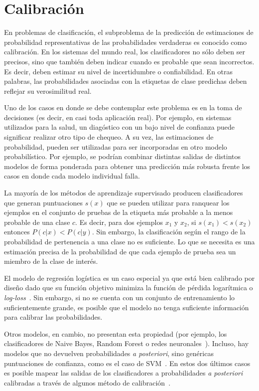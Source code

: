 \chapter{Calibración}\label{appendix:calibracion} 

En problemas de clasificación, el subproblema de la predicción de estimaciones
de probabilidad representativas de las probabilidades verdaderas es conocido
como calibración. En los sistemas del mundo real, los clasificadores no sólo
deben ser precisos, sino que también deben indicar cuando es probable que sean
incorrectos. Es decir, deben estimar su nivel de incertidumbre o confiabilidad.
En otras palabras, las probabilidades asociadas con la etiquetas de clase
predichas deben reflejar su verosimilitud real.

Uno de los casos en donde se debe contemplar este problema es en la toma de
decisiones (es decir, en casi toda aplicación real). Por ejemplo, en sistemas
utilizados para la salud, un diagóstico con un bajo nivel de confianza puede
significar realizar otro tipo de chequeo. A su vez, las estimaciones de
probabilidad, pueden ser utilizadas para ser incorporadas en otro modelo
probabilístico. Por ejemplo, se podrían combinar distintas salidas de distintos
modelos de forma ponderada para obtener una predicción más robusta frente los
casos en donde cada modelo individual falla.

La mayoría de los métodos de aprendizaje supervisado producen clasificadores que
generan puntuaciones $s(x)$ que se pueden utilizar para ranquear los ejemplos en
el conjunto de pruebas de la etiqueta más probable a la menos probable de una
clase $c$. Es decir, para dos ejemplos $x_1$ y $x_2$, si $s(x_1) < s(x_2)$
entonces $P(c|x) < P(c|y)$. Sin embargo, la clasificación según el rango de la
probabilidad de pertenencia a una clase no es suficiente. Lo que se necesita es
una estimación precisa de la probabilidad de que cada ejemplo de prueba sea un
miembro de la clase de interés.

El modelo de regresión logística es un caso especial ya que está bien calibrado
por diseño dado que su función objetivo minimiza la función de pérdida
logarítmica o {\it log-loss\/}~\cite{morrison2013tutorial}. Sin  embargo, si no
se cuenta con un conjunto de entrenamiento lo suficientemente grande, es posible
que el modelo no tenga suficiente información para calibrar las probabilidades.

Otros modelos, en cambio, no presentan esta propiedad (por ejemplo, los
clasificadores de Naive Bayes, Random Forest o redes
neuronales~\cite{zadrozny2002transforming, niculescu2005predicting,
guo2017calibration}). Incluso, hay modelos que no devuelven probabilidades {\it
a posteriori}, sino genéricas puntuaciones de confianza, como es el caso de
SVM~\cite{platt1999probabilistic}. En estos dos últimos casos es posible mapear
las salidas de los clasificadores a probabilidades {\it a posteriori\/}
calibradas a través de algunos método de
calibración~\cite{platt1999probabilistic, zadrozny2002transforming,
niculescu2005predicting, guo2017calibration}.

